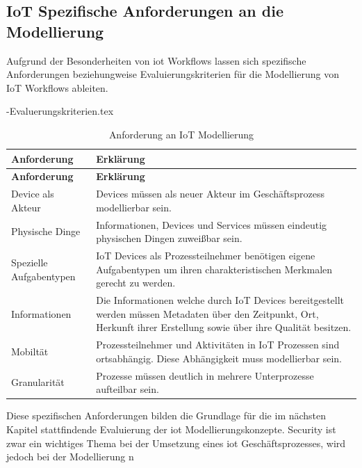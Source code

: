 \documentclass[a4paper, 12pt, twoside, headsepline=true]{scrartcl} %
\begin{document}
\subsection{IoT Spezifische Anforderungen an die Modellierung}\label{anforderungen}
Aufgrund der Besonderheiten von \ac{iot} Workflows lassen sich spezifische Anforderungen beziehungweise Evaluierungskriterien für die Modellierung von IoT Workflows ableiten.

\begin{filecontents}{\jobname-Evaluerungskriterien.tex}
	\begin{longtable}{P{4.5cm}|X}
		\caption{Anforderung an IoT Modellierung}\\
		\label{table:evaluierungskriterien}
		\textbf{Anforderung} & \textbf{Erklärung}   \\ \hline
		\endfirsthead %
		\textbf{Anforderung} & \textbf{Erklärung}  \\ \hline
		\endhead %
Device als Akteur & Devices müssen als neuer Akteur im Geschäftsprozess modellierbar sein.\\ \hline
Physische Dinge  & Informationen, Devices und Services müssen eindeutig physischen Dingen zuweißbar sein.\\ \hline
Spezielle Aufgabentypen & IoT Devices als Prozessteilnehmer benötigen eigene Aufgabentypen um ihren charakteristischen Merkmalen gerecht zu werden.\\ \hline
Informationen  & Die Informationen welche durch IoT Devices bereitgestellt werden müssen Metadaten über den Zeitpunkt, Ort, Herkunft ihrer Erstellung sowie über ihre Qualität besitzen.\\ \hline
Mobiltät & Prozessteilnehmer und Aktivitäten in IoT Prozessen sind ortsabhängig. Diese Abhängigkeit muss modellierbar sein.\\ \hline
Granularität & Prozesse müssen deutlich in mehrere Unterprozesse aufteilbar sein.\\
	\end{longtable}
\end{filecontents}
 
Diese spezifischen Anforderungen bilden die Grundlage für die im nächsten Kapitel stattfindende Evaluierung der \ac{iot} Modellierungskonzepte. Security ist zwar ein wichtiges Thema bei der Umsetzung eines \ac{iot} Geschäftsprozesses, wird jedoch bei der Modellierung n
 
\end{document}
